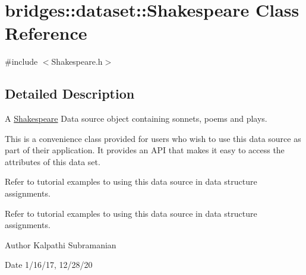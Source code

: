 \hypertarget{classbridges_1_1dataset_1_1_shakespeare}{}\section{bridges\+:\+:dataset\+:\+:Shakespeare Class Reference}
\label{classbridges_1_1dataset_1_1_shakespeare}


{\ttfamily \#include $<$Shakespeare.\+h$>$}



\subsection{Detailed Description}
A \hyperlink{classbridges_1_1dataset_1_1_shakespeare}{Shakespeare} Data source object containing sonnets, poems and plays. 

This is a convenience class provided for users who wish to use this data source as part of their application. It provides an A\+PI that makes it easy to access the attributes of this data set.

Refer to tutorial examples to using this data source in data structure assignments.

Refer to tutorial examples to using this data source in data structure assignments.

\begin{DoxyAuthor}{Author}
Kalpathi Subramanian 
\end{DoxyAuthor}
\begin{DoxyDate}{Date}
1/16/17, 12/28/20 
\end{DoxyDate}
